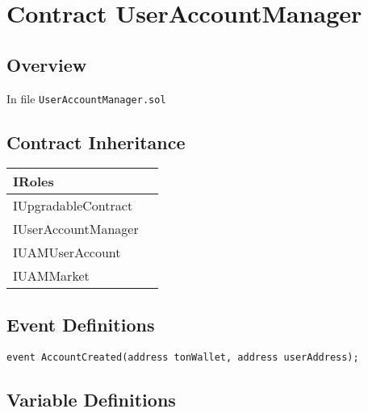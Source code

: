 
\chapter{Contract UserAccountManager}

\minitoc

\section{Overview}


In file {\tt UserAccountManager.sol}

\section{Contract Inheritance}


\noindent\begin{tabular}{|l|p{5cm}|}\hline
IRoles & \\\hline
IUpgradableContract & \\\hline
IUserAccountManager & \\\hline
IUAMUserAccount & \\\hline
IUAMMarket & \\\hline
\end{tabular}


\section{Event Definitions}


\begin{lstlisting}[firstnumber=33]
    event AccountCreated(address tonWallet, address userAddress);
\end{lstlisting}

\section{Variable Definitions}


